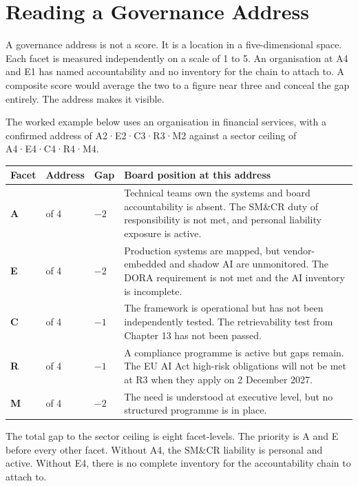\section{Reading a Governance Address}

A governance address is not a score. It is a location in a five-dimensional space. Each facet is measured independently on a scale of 1 to 5. An organisation at A4 and E1 has named accountability and no inventory for the chain to attach to. A composite score would average the two to a figure near three and conceal the gap entirely. The address makes it visible.

The worked example below uses an organisation in financial services, with a confirmed address of A2·E2·C3·R3·M2 against a sector ceiling of A4·E4·C4·R4·M4.

\begingroup
\small
\begin{longtable}[]{@{}
  >{\raggedright\arraybackslash}p{}
  >{\raggedright\arraybackslash}p{}
  >{\raggedright\arraybackslash}p{}
  >{\raggedright\arraybackslash}p{}@{}}
\toprule\noalign{}
\textbf{Facet} & \textbf{Address} & \textbf{Gap} & \textbf{Board position at this address} \\
\midrule\noalign{}
\endhead
\bottomrule\noalign{}
\endlastfoot
\textbf{A} & 2 of 4 & $-2$ & Technical teams own the systems and board accountability is absent. The SM\&CR duty of responsibility is not met, and personal liability exposure is active. \\
\textbf{E} & 2 of 4 & $-2$ & Production systems are mapped, but vendor-embedded and shadow AI are unmonitored. The DORA requirement is not met and the AI inventory is incomplete. \\
\textbf{C} & 3 of 4 & $-1$ & The framework is operational but has not been independently tested. The retrievability test from Chapter 13 has not been passed. \\
\textbf{R} & 3 of 4 & $-1$ & A compliance programme is active but gaps remain. The EU AI Act high-risk obligations will not be met at R3 when they apply on 2 December 2027. \\
\textbf{M} & 2 of 4 & $-2$ & The need is understood at executive level, but no structured programme is in place. \\
\end{longtable}
\endgroup

The total gap to the sector ceiling is eight facet-levels. The priority is A and E before every other facet. Without A4, the SM\&CR liability is personal and active. Without E4, there is no complete inventory for the accountability chain to attach to.
